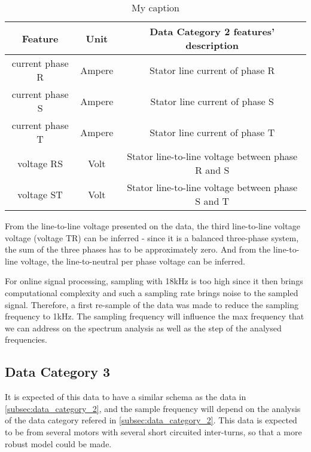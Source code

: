 \begin{table}[htpb]
\centering
\caption{My caption}
\label{my-label}
\begin{tabular}{@{}ccc@{}}
\toprule
\textbf{Feature} & \textbf{Unit} &                                                   \textbf{Data Category 2 features' description} \\ \midrule
current phase R  & Ampere        & Stator line current of phase R                    \\
current phase S  & Ampere        & Stator line current of phase S                    \\
current phase T  & Ampere        & Stator line current of phase T                    \\
voltage RS       & Volt          & Stator line-to-line voltage between phase R and S \\
voltage ST       & Volt          & Stator line-to-line voltage between phase S and T \\ \bottomrule
\end{tabular}
\end{table}


From the line-to-line voltage presented on the data, the third line-to-line voltage voltage (voltage TR) can be inferred - since it is a balanced three-phase system, the sum of the three phases has to be approximately zero. And from the line-to-line voltage, the line-to-neutral per phase voltage can be inferred.

For online signal processing, sampling with 18kHz is too high since it then brings computational complexity and such a sampling rate brings noise to the sampled signal. Therefore, a first re-sample of the data was made to reduce the sampling frequency to 1kHz. The sampling frequency will influence the max frequency that we can address on the spectrum analysis as well as the step of the analysed frequencies.

\subsection{Data Category 3}
\label{subsec:data_category_3}

It is expected of this data to have a similar schema as the data in \ref{subsec:data_category_2}, and the sample frequency will depend on the analysis of the data category refered in \ref{subsec:data_category_2}. This data is expected to be from several motors with several short circuited inter-turns, so that a more robust model could be made.